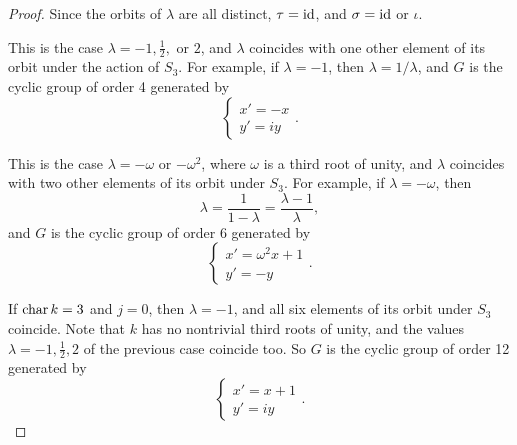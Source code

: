 \documentclass[a4paper]{article}
\begin{document}
\begin{enumerate} [label=\textbf{\arabic*.}, leftmargin=0em]
\begin{proof}
               Since the orbits of $\lambda$ are all distinct, $\tau = \operatorname{id}$, and $\sigma = \operatorname{id}$ or $\iota$.

              This is the case $\lambda = -1, \frac{1}{2},$ or $2$, and $\lambda$ coincides with one other element of its orbit under the action of $S_3$.
              For example, if $\lambda = -1$, then $\lambda = 1/\lambda$, and $G$ is the cyclic group of order 4 generated by
              \begin{equation*}
                  \begin{cases*}
                      x' = - x \\
                      y' = iy
                  \end{cases*}.
              \end{equation*}

              This is the case $\lambda = -\omega$ or $-\omega^2$, where $\omega$ is a third root of unity, and $\lambda$ coincides with two other elements of its orbit under $S_3$.
              For example, if $\lambda = -\omega$, then
              \begin{equation*}
                  \lambda = \frac{1}{1 - \lambda} = \frac{\lambda - 1}{\lambda},
              \end{equation*}
              and $G$ is the cyclic group of order 6 generated by
              \begin{equation*}
                  \begin{cases*}
                      x' = \omega^2 x + 1 \\
                      y' = -y
                  \end{cases*}.
              \end{equation*}

              If $\operatorname{char}{k} = 3$ and $j = 0$, then $\lambda = -1$, and all six elements of its orbit under $S_3$ coincide.
              Note that $k$ has no nontrivial third roots of unity, and the values $\lambda = -1, \frac{1}{2}, 2$ of the previous case coincide too.
              So $G$ is the cyclic group of order 12 generated by
              \begin{equation*}
                  \begin{cases*}
                      x' = x + 1 \\
                      y' = iy
                  \end{cases*}.
              \end{equation*}
          \end{proof}


\end{enumerate}
\end{document}
